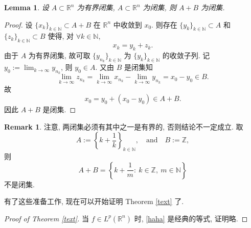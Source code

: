 \documentclass[a4paper,11pt]{article}
\newtheorem{lemma}[theorem]{Lemma}
\theoremstyle{definition}
\newtheorem{remark}[theorem]{Remark}
\begin{document}
\begin{CJK*}{UTF8}{gbsn}
\begin{lemma} \label{924}
    设 $ A \subset \mathbb{R}^n $ 为有界闭集, $ A \subset \mathbb{R}^n $ 为闭集, 则 $ A+B $ 为闭集.
\end{lemma}

\begin{proof}
    设 $ \{x_k\}_{k \in \mathbb{N}} \subset A+B $ 在 $ \mathbb{R}^n $ 中收敛到 $ x_0 $.
    则存在 $ \{y_k\}_{k \in \mathbb{N}} \subset A $ 和 $ \{z_k\}_{k \in \mathbb{N}} \subset B $
    使得, 对 $ \forall k \in \mathbb{N} $,
    $$
        x_k = y_k + z_k.
    $$
    由于 $ A $ 为有界闭集, 故可取 $ \{y_{n_k}\}_{k \in \mathbb{N}} $ 为 $ \{y_k\}_{k \in \mathbb{N}} $ 的收敛子列.
    记 $ y_0 := \lim_{k \to \infty} y_{n_k} $, 则 $ y_0 \in A $. 又由 $ B $ 是闭集知
    $$
        \lim_{k \to \infty} z_{n_k} 
            = \lim_{k \to \infty} x_{n_k} - \lim_{k \to \infty} y_{n_k} 
            = x_0 - y_0
            \in B.
    $$
    故
    $$
        x_0 = y_0 + (x_0 - y_0) \in A + B.
    $$
    因此 $ A + B $ 是闭集.
\end{proof}

\begin{remark}
    注意, 两闭集必须有其中之一是有界的, 否则结论不一定成立.
    取 
    $$ 
        A := \left\{ k + \frac{1}{k} \right\}_{k \in \mathbb{N}}, 
        \quad \text{and} \quad 
        B := \mathbb{Z},
    $$ 
    则
    $$
        A + B = \left\{ k + \frac{1}{m}:\ k \in \mathbb{Z},\ m \in \mathbb{N} \right\}
    $$
    不是闭集.
\end{remark}

有了这些准备工作, 现在可以开始证明 Theorem \ref{text} 了.

\begin{proof}[Proof of Theorem \ref{text}]
    当 $ f \in L^p(\mathbb{R}^n) $ 时, \eqref{haha} 是经典的等式, 证明略.
    

\end{proof}
\end{CJK*}
\end{document}

